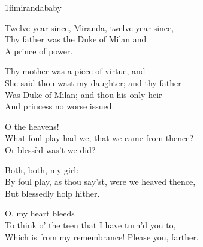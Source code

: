 

\begin{pictures} %
	
\begin{bwbigpic}
	[\picwidth]
	{1iimirandababy}
	{}
\end{bwbigpic}
\end{pictures}


\begin{verse_speech}[Prospero] 
	Twelve year since, Miranda, twelve year since,\\
Thy father was the Duke of Milan and\\
A prince of power.
\end{verse_speech}

	
\begin{verse_speech}[Prospero] 
Thy mother was a piece of virtue, and\\
She said thou wast my daughter; and thy father\\
Was Duke of Milan; and thou his only heir\\
And princess no worse issued.
\end{verse_speech}

\begin{verse_speech}[Miranda] 
O the heavens!\\
What foul play had we, that we came from thence?\\
Or blessèd was't we did?
\end{verse_speech}

\begin{verse_speech}[Prospero] 
Both, both, my girl:\\
By foul play, as thou say'st, were we heaved thence,\\
But blessedly holp hither.
\end{verse_speech}

\begin{verse_speech}[Miranda] 
O, my heart bleeds\\
To think o' the teen that I have turn'd you to,\\
Which is from my remembrance! Please you, farther.
\end{verse_speech}

